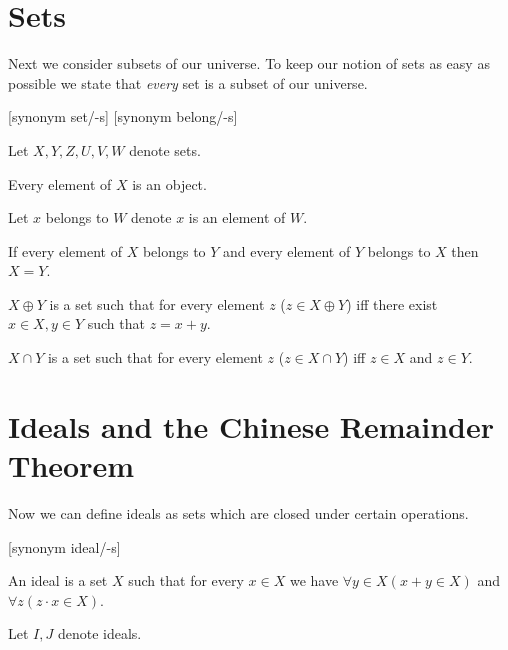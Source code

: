 \documentclass{article}
\begin{document}
  \section{Sets}

  Next we consider subsets of our universe. To keep our notion of sets as easy
  as possible we state that \textit{every} set is a subset of our universe.

  \begin{forthel}

    [synonym set/-s] [synonym belong/-s]

    Let $X,Y,Z,U,V,W$ denote sets.

    \begin{axiom}
      Every element of $X$ is an object.
    \end{axiom}

    Let $x$ belongs to $W$ denote $x$ is an element of $W$.

    \begin{axiom}[SetEq]
      If every element of $X$ belongs to $Y$ and every element of $Y$ belongs to
      $X$ then $X = Y$.
    \end{axiom}

    \begin{definition}[DefSum]
      $X \oplus Y$ is a set such that for every element $z$ ($z \in X \oplus Y$)
      iff there exist $x \in X, y \in Y$ such that $z = x + y$.
    \end{definition}

    \begin{definition}[DefSInt]
      $X \cap Y$ is a set such that for every element $z$ ($z \in X \cap Y$) iff
      $z \in X$ and $z \in Y$.
    \end{definition}
  \end{forthel}


  \section{Ideals and the Chinese Remainder Theorem}

  Now we can define ideals as sets which are closed under certain operations.

  \begin{forthel}

    [synonym ideal/-s]

    \begin{definition}[DefIdeal]
      An ideal is a set $X$ such that for every $x \in X$ we have
        $\forall y \in X (x + y \in X)$ and
        $\forall z (z \cdot x \in X)$.
    \end{definition}

    Let $I,J$ denote ideals.
  \end{forthel}
\end{document}
